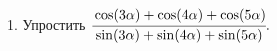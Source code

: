 1. Упростить $\cfrac{\cos(3\alpha)+\cos(4\alpha)+\cos(5\alpha)}{\sin(3\alpha)+\sin(4\alpha)+\sin(5\alpha)}.$\\
